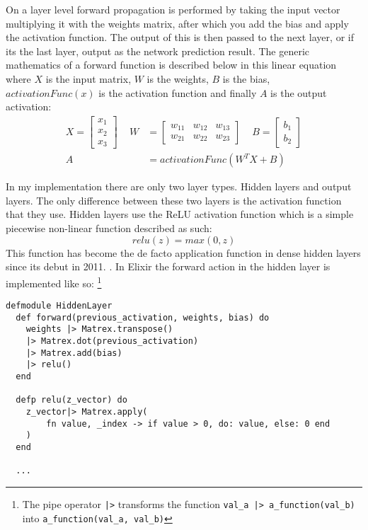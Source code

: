 On a layer level forward propagation is performed by taking the input vector
multiplying it with the weights matrix, after which you add the bias and apply
the activation function. The output of this is then passed to the next layer, or
if its the last layer, output as the network prediction result. The generic
mathematics of a forward function is described below in this linear equation
where  \(X\) is the input matrix, \(W\) is the weights, \(B\) is the bias,
\(activationFunc(x)\) is the activation function and finally \(A\) is the output
activation:
\begin{equation}
    \begin{aligned}
        X = \begin{bmatrix}
            x_{1} \\
            x_{2} \\
            x_{3}
        \end{bmatrix} \, \, \, \, \, \, \,
        W &= \begin{bmatrix}
            w_{11} & w_{12} & w_{13} \\
            w_{21} & w_{22} & w_{23}
        \end{bmatrix} \, \, \, \, \, \, \,
        B = \begin{bmatrix}
            b_{1} \\
            b_{2}
        \end{bmatrix} \\[10pt]
        A &= activationFunc( W^{T}X + B )
    \end{aligned}
\end{equation}

In my implementation there are only two layer types. Hidden layers and output
layers. The only difference between these two layers is the activation function
that they use. Hidden layers use the ReLU activation function which is a simple
piecewise non-linear function described as such:
\begin{equation}
    relu(z) = max(0,z)
\end{equation}
This function has become the de facto application function in dense hidden
layers since its debut in 2011. \cite{glorot2011deep}. In Elixir the forward
action in the hidden layer is implemented like so: \footnote{The pipe operator
\lstinline{|>} transforms the function \lstinline{val_a |> a_function(val_b)}
into \lstinline{a_function(val_a, val_b)}}
\begin{lstlisting}
defmodule HiddenLayer
  def forward(previous_activation, weights, bias) do
    weights |> Matrex.transpose()
    |> Matrex.dot(previous_activation)
    |> Matrex.add(bias)
    |> relu()
  end

  defp relu(z_vector) do
    z_vector|> Matrex.apply(
        fn value, _index -> if value > 0, do: value, else: 0 end
    )
  end

  ...
\end{lstlisting}

